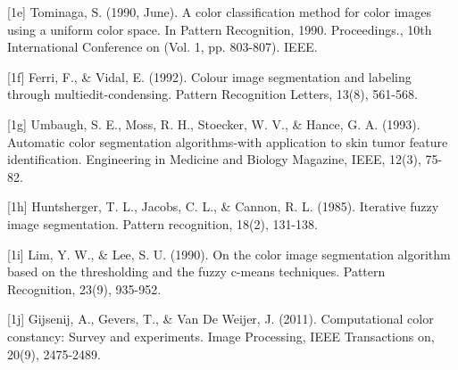 \documentclass{article} %
\begin{document}
{[1e] Tominaga, S. (1990, June). A color classification method for color images using a uniform color space. In Pattern Recognition, 1990. Proceedings., 10th International Conference on (Vol. 1, pp. 803-807). IEEE.

[1f] Ferri, F., \& Vidal, E. (1992). Colour image segmentation and labeling through multiedit-condensing. Pattern Recognition Letters, 13(8), 561-568.

[1g] Umbaugh, S. E., Moss, R. H., Stoecker, W. V., \& Hance, G. A. (1993). Automatic color segmentation algorithms-with application to skin tumor feature identification. Engineering in Medicine and Biology Magazine, IEEE, 12(3), 75-82.

[1h] Huntsherger, T. L., Jacobs, C. L., \& Cannon, R. L. (1985). Iterative fuzzy image segmentation. Pattern recognition, 18(2), 131-138.

[1i] Lim, Y. W., \& Lee, S. U. (1990). On the color image segmentation algorithm based on the thresholding and the fuzzy c-means techniques. Pattern Recognition, 23(9), 935-952.

[1j] Gijsenij, A., Gevers, T., \& Van De Weijer, J. (2011). Computational color constancy: Survey and experiments. Image Processing, IEEE Transactions on, 20(9), 2475-2489.



}
\end{document}
